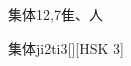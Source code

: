\begin{entry}{集体}{12,7}{⾫、⼈}
  \begin{phonetics}{集体}{ji2ti3}[][HSK 3]
  \end{phonetics}
\end{entry}
